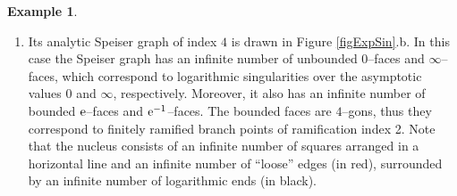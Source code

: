 \documentclass[final,3p,times]{elsarticle}
\newcommand{\CC}{\ensuremath{{\mathbb C}}}
\theoremstyle{definition}
\newtheorem{example}{Example}[section]
\begin{document}
\begin{example}
\begin{enumerate}[label=\alph*),leftmargin=*]
\centerline{$\CC_z \cup \{ 
\infty_{{\tt a}_{1\pm}}, \, 
\infty_{{\tt a}_{2\pm}}, \, 
\ldots, 
\infty_{{\tt a}_{\sigma\pm}},\,
\ldots
\}$}

\noindent 
determined by the asymptotic values ${\tt a}_{\sigma\pm}=0$ and 
${\tt a}_{\sigma\pm}=\infty$, for odd or even $\sigma$ respectively.

\item
Its analytic Speiser graph of index $4$ is drawn in Figure \ref{figExpSin}.b.
In this case the Speiser graph has an infinite number of unbounded 0--faces 
and $\infty$--faces, which correspond to logarithmic singularities over the 
asymptotic values 0 and $\infty$, respectively. 
Moreover, it also has an infinite number of bounded $\rm e$--faces and ${\rm e}^{-1}$--faces. 
The bounded faces are $4$--gons, thus they correspond to 
finitely ramified branch points of ramification index 2.
Note that the nucleus consists of an infinite number of squares arranged in a horizontal line 
and an infinite number of ``loose'' edges (in red), 
surrounded by an infinite number of logarithmic ends (in black).

\end{enumerate}
\end{example}
\end{document}
